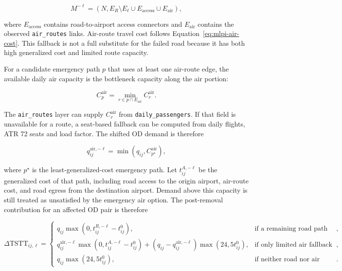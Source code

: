 \documentclass[11pt,a4paper]{article}
\begin{document}
\begin{equation}
M^{-\ell}=(N,E_R\setminus E_{\ell}\cup E_{\mathrm{access}}\cup E_{\mathrm{air}}),
\end{equation}

where $E_{\mathrm{access}}$ contains road-to-airport access connectors and
$E_{\mathrm{air}}$ contains the observed \texttt{air\_routes} links. Air-route
travel cost follows Equation~\ref{eq:mlpi-air-cost}. This fallback is not a
full substitute for the failed road because it has both high generalized cost
and limited route capacity.

For a candidate emergency path $p$ that uses at least one air-route edge, the
available daily air capacity is the bottleneck capacity along the air portion:

\begin{equation}
C^{\mathrm{air}}_p
=\min_{r\in p\cap E_{\mathrm{air}}} C^{\mathrm{air}}_r .
\end{equation}

The \texttt{air\_routes} layer can supply $C^{\mathrm{air}}_r$ from
\texttt{daily\_passengers}. If that field is unavailable for a route, a
seat-based fallback can be computed from daily flights, ATR 72 seats and load
factor. The shifted OD demand is therefore

\begin{equation}
q^{\mathrm{air},-\ell}_{ij}
=\min(q_{ij}, C^{\mathrm{air}}_{p^\star}),
\end{equation}

where $p^\star$ is the least-generalized-cost emergency path. Let
$t^{A,-\ell}_{ij}$ be the generalized cost of that path, including road access
to the origin airport, air-route cost, and road egress from the destination
airport. Demand above this capacity is still treated as unsatisfied by the
emergency air option. The post-removal contribution for an affected OD pair is
therefore

\begin{equation}
\Delta \mathrm{TSTT}_{ij,\ell}=
\begin{cases}
q_{ij}\max(0,t^{R,-\ell}_{ij}-t^0_{ij}),
& \text{if a remaining road path exists},\\
q^{\mathrm{air},-\ell}_{ij}\max(0,t^{A,-\ell}_{ij}-t^0_{ij})
+(q_{ij}-q^{\mathrm{air},-\ell}_{ij})\max(24,5t^0_{ij}),
& \text{if only limited air fallback exists},\\
q_{ij}\max(24,5t^0_{ij}),
& \text{if neither road nor air fallback is available}.
\end{cases}
\label{eq:mlpi-removed-time}
\end{equation}
\end{document}
